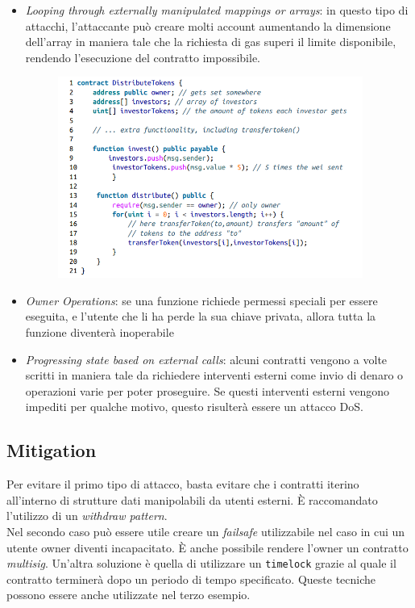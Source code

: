 \begin{itemize}
      \item \textit{Looping through externally manipulated mappings or arrays}:
            in questo tipo di attacchi, l'attaccante può creare molti account aumentando
            la dimensione dell'array in maniera tale che la richiesta di gas superi il
            limite disponibile, rendendo l'esecuzione del contratto impossibile.
            \begin{figure}[H]
                  \centering
                  \includegraphics[width=10cm, keepaspectratio]{capitoli/ethereum/imgs/dos_looping.png}
            \end{figure}
      \item \textit{Owner Operations}:
            se una funzione richiede permessi speciali per essere eseguita,
            e l'utente che li ha perde la sua chiave privata,
            allora tutta la funzione diventerà inoperabile
      \item \textit{Progressing state based on external calls}:
            alcuni contratti vengono a volte scritti in maniera tale da richiedere
            interventi esterni come invio di denaro o operazioni varie per poter
            proseguire. Se questi interventi esterni vengono impediti per qualche motivo,
            questo risulterà essere un attacco DoS.
\end{itemize}

\subsection{Mitigation}

Per evitare il primo tipo di attacco,
basta evitare che i contratti iterino all'interno di strutture dati manipolabili
da utenti esterni. È raccomandato l'utilizzo di un \textit{withdraw pattern}.\\

Nel secondo caso può essere utile creare un \textit{failsafe} utilizzabile nel
caso in cui un utente owner diventi incapacitato.
È anche possibile rendere l'owner un contratto \textit{multisig}.
Un'altra soluzione è quella di utilizzare un \verb|timelock| grazie al quale il
contratto terminerà dopo un periodo di tempo specificato.
Queste tecniche possono essere anche utilizzate nel terzo esempio.